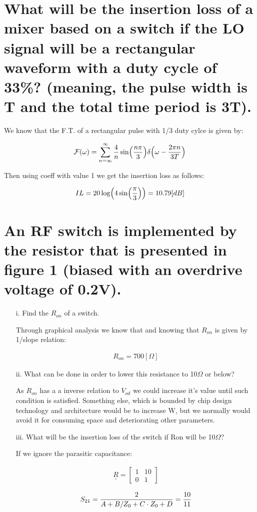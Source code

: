 \documentclass[12pt, letterpaper]{article}
\begin{document}
\section{What will be the insertion loss of a mixer based on a switch if the LO signal will be a rectangular waveform with a duty cycle of 33\%? (meaning, the pulse width is T and the total time period is 3T).}

{\color{blue}We know that the F.T. of a rectangular pulse with 1/3 duty cylce is given by:}

\begin{align}
  \mathcal{F}(\omega)=\sum^{\infty}_{n=\infty}{4\over n}\sin({n\pi\over3})\delta\Big(\omega-{2\pi n\over 3T}\Big)
\end{align}

{\color{blue}Then using coeff with value 1 we get the insertion loss as follows:}

\begin{align}
  IL=20\log(4\sin({\pi\over3}))=10.79[dB]
\end{align}

\pagebreak
\section{An RF switch is implemented by the resistor that is presented in figure 1 (biased with an overdrive voltage of 0.2V).}

\begin{itemize}
  \item [i.] Find the $R_{on}$ of a switch.

  {\color{blue}Through graphical analysis we know that and knowing that $R_{on}$ is given by 1/slope relation:}

  \begin{align}
    R_{on}=700[\Omega]
  \end{align}

  \item [ii.] What can be done in order to lower this resistance to 10$\Omega$ or below?

  {\color{blue}As $R_{on}$ has a a inverse relation to $V_{od}$ we could increase it's value until such condition is satisfied. Something else, which is bounded by chip design technology and architecture would be to increase W, but we normally would avoid it for consuming space and deteriorating other parameters.}

  \item [iii.] What will be the insertion loss of the switch if Ron will be 10$\Omega$?

  {\color{blue} If we ignore the parasitic capacitance:}

  \begin{align}
    \underline{\underline{R}}
    =
    \begin{bmatrix}
      1 & 10\\
      0 & 1
    \end{bmatrix}
  \end{align}

  \begin{align}
    S_{21}={2\over A+B/Z_0+C\cdot Z_0+D}={10\over 11}
  \end{align}

\end{itemize}
\end{document}
